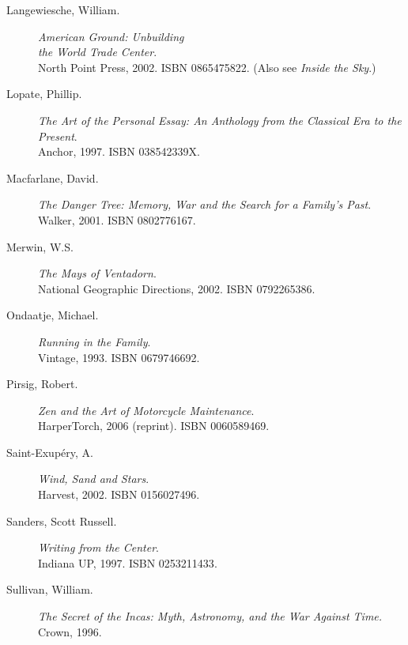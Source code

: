 \documentclass[10pt,DIV09,letterpaper,oneside,headsepline]{scrreprt}
\begin{document}
\begin{flushleft}
\begin{description}
\item [Langewiesche, William.] \textit{American Ground: Unbuilding
\\the World Trade Center}. \\North Point Press, 2002.
\textsc{ISBN 0865475822}. (Also see \textit{Inside the Sky}.)
\item [Lopate, Phillip.] \textit{The Art of the Personal Essay: An
Anthology from the Classical Era to the Present}. \\Anchor, 1997.
\textsc{ISBN 038542339X}.
\item [Macfarlane, David.] \textit{The Danger Tree: Memory, War and
the Search for a Family's Past}. \\Walker, 2001. \textsc{ISBN
0802776167}.
\item [Merwin, W.S.] \textit{The Mays of Ventadorn}. \\National
Geographic Directions, 2002. \textsc{ISBN 0792265386}.
\item [Ondaatje, Michael.] \textit{Running in the Family}. \\Vintage,
1993. \textsc{ISBN 0679746692}.
\item [Pirsig, Robert.] \textit{Zen and the Art of Motorcycle
Maintenance}. \\HarperTorch, 2006 (reprint). \textsc{ISBN
0060589469}.
\item [Saint-Exup\'ery, A.] \textit{Wind, Sand and Stars}. \\Harvest,
2002. \textsc{ISBN 0156027496}.
\item [Sanders, Scott Russell.] \textit{Writing from the Center}.
\\Indiana UP, 1997. \textsc{ISBN 0253211433}.
\item [Sullivan, William.] \textit{The Secret of the Incas: Myth,
Astronomy, and the War Against Time.} \\Crown, 1996.
\end{description}


\end{flushleft}
\end{document}
